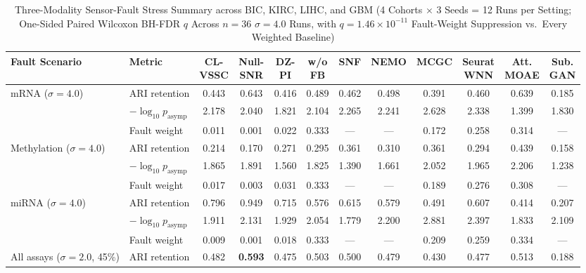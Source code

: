 \begin{table}[t]
\centering
\caption{Three-Modality Sensor-Fault Stress Summary across BIC, KIRC, LIHC, and GBM (4 Cohorts $\times$ 3 Seeds = 12 Runs per Setting; One-Sided Paired Wilcoxon BH-FDR $q$ Across $n=36$ $\sigma=4.0$ Runs, with $q = 1.46{\times}10^{-11}$ Fault-Weight Suppression vs.\ Every Weighted Baseline)}
\label{tab:p2_fault}
\scriptsize
\renewcommand{\arraystretch}{1.14}
\setlength{\tabcolsep}{2.2pt}
\begin{tabular}{llcccccccccc}
\toprule
Fault Scenario & Metric & \shortstack{CL-\\VSSC} & \shortstack{Null-\\SNR} & \shortstack{DZ-\\PI} & \shortstack{w/o\\FB} & SNF & NEMO & MCGC & \shortstack{Seurat\\WNN} & \shortstack{Att.\\MOAE} & \shortstack{Sub.\\GAN} \\
\midrule
mRNA ($\sigma{=}4.0$) & ARI retention & 0.443 & 0.643 & 0.416 & 0.489 & 0.462 & 0.498 & 0.391 & 0.460 & 0.639 & 0.185 \\
 & $-\log_{10}p_{\mathrm{asymp}}$ & 2.178 & 2.040 & 1.821 & 2.104 & 2.265 & 2.241 & 2.628 & 2.338 & 1.399 & 1.830 \\
 & Fault weight & 0.011 & 0.001 & 0.022 & 0.333 & --- & --- & 0.172 & 0.258 & 0.314 & --- \\
\midrule
Methylation ($\sigma{=}4.0$) & ARI retention & 0.214 & 0.170 & 0.271 & 0.295 & 0.361 & 0.310 & 0.361 & 0.294 & 0.439 & 0.158 \\
 & $-\log_{10}p_{\mathrm{asymp}}$ & 1.865 & 1.891 & 1.560 & 1.825 & 1.390 & 1.661 & 2.052 & 1.965 & 2.206 & 1.238 \\
 & Fault weight & 0.017 & 0.003 & 0.031 & 0.333 & --- & --- & 0.189 & 0.276 & 0.308 & --- \\
\midrule
miRNA ($\sigma{=}4.0$) & ARI retention & 0.796 & 0.949 & 0.715 & 0.576 & 0.615 & 0.579 & 0.491 & 0.607 & 0.414 & 0.207 \\
 & $-\log_{10}p_{\mathrm{asymp}}$ & 1.911 & 2.131 & 1.929 & 2.054 & 1.779 & 2.200 & 2.881 & 2.397 & 1.833 & 2.109 \\
 & Fault weight & 0.009 & 0.001 & 0.018 & 0.333 & --- & --- & 0.209 & 0.259 & 0.334 & --- \\
\midrule
All assays ($\sigma{=}2.0$, 45\%) & ARI retention & 0.482 & \textbf{0.593} & 0.475 & 0.503 & 0.500 & 0.479 & 0.430 & 0.477 & 0.513 & 0.188 \\

\end{tabular}
\end{table}

